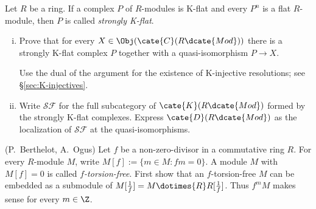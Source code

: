 \begin{Exercises}
	\item Let $R$ be a ring. If a complex $P$ of $R$-modules is K-flat and
	every $P^n$ is a flat $R$-module, then $P$ is called \emph{strongly
	K-flat}.
	\begin{enumerate}[(i)]
		\item Prove that for every $X\in\Obj(\cate{C}(R\dcate{Mod}))$ there is a
		strongly K-flat complex $P$ together with a quasi-isomorphism $P\to X$.
		\begin{hint}
			Use the dual of the argument for the existence of K-injective
			resolutions; see \S\ref{sec:K-injectives}.
		\end{hint}
		\item Write $\mathcal{SF}$ for the full subcategory of
		$\cate{K}(R\dcate{Mod})$ formed by the strongly K-flat complexes.
		Express $\cate{D}(R\dcate{Mod})$ as the localization of $\mathcal{SF}$
		at the quasi-isomorphisms.
	\end{enumerate}

	\item (P.\ Berthelot, A.\ Ogus) Let $f$ be a non-zero-divisor in a
	commutative ring $R$. For every $R$-module $M$, write
	$M[f]:=\{m\in M:fm=0\}$. A module $M$ with $M[f]=0$ is called
	\emph{$f$-torsion-free}. First show that an $f$-torsion-free $M$ can be
	embedded as a submodule of
	$M[\frac{1}{f}]=M\dotimes{R}R[\frac{1}{f}]$. Thus $f^mM$ makes sense for
	every $m\in\Z$.


\end{Exercises}

